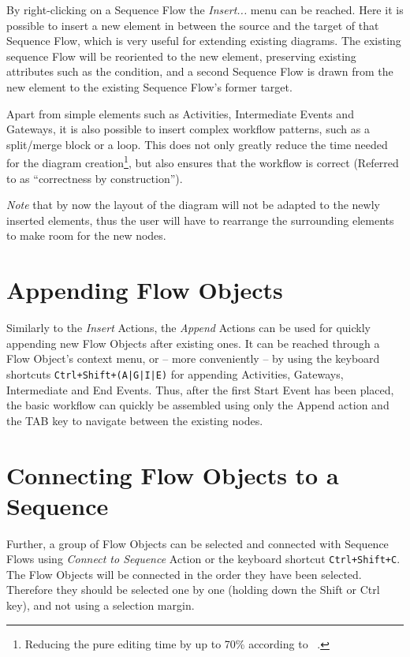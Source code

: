 By right-clicking on a Sequence Flow the \emph{Insert...} menu can be reached. Here it is possible
to insert a new element in between the source and the target of that Sequence Flow, which is very
useful for extending existing diagrams. The existing sequence Flow will be reoriented to the new
element, preserving existing attributes such as the condition, and a second Sequence Flow is drawn
from the new element to the existing Sequence Flow's former target.

Apart from simple elements such as Activities, Intermediate Events and Gateways, it is also possible
to insert complex workflow patterns, such as a split/merge block or a loop. This does not only
greatly reduce the time needed for the diagram creation\footnote{Reducing the pure editing time by
up to 70\% according to ~\cite{gschwind2008applying}.}, but also ensures that the workflow is
correct (Referred to as ``correctness by construction'').

\emph{Note} that by now the layout of the diagram will not be adapted to the newly inserted
elements, thus the user will have to rearrange the surrounding elements to make room for the new
nodes.

\section{Appending Flow Objects}
Similarly to the \emph{Insert} Actions, the \emph{Append} Actions can be used for quickly appending
new Flow Objects after existing ones. It can be reached through a Flow Object's context menu, or --
more conveniently -- by using the keyboard shortcuts \texttt{Ctrl+Shift+(A|G|I|E)} for appending
Activities, Gateways, Intermediate and End Events. Thus, after the first Start Event has been
placed, the basic workflow can quickly be assembled using only the Append action and the TAB key to
navigate between the existing nodes.

\section{Connecting Flow Objects to a Sequence}
Further, a group of Flow Objects can be selected and connected with Sequence Flows using
\emph{Connect to Sequence} Action or the keyboard shortcut \texttt{Ctrl+Shift+C}. The Flow Objects
will be connected in the order they have been selected. Therefore they should be selected one by one
(holding down the Shift or Ctrl key), and not using a selection margin.


